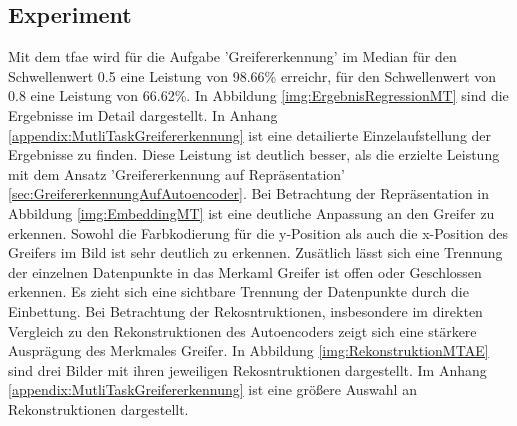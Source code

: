 	\subsection{Experiment}
	Mit dem \ac{tfae} wird für die Aufgabe 'Greifererkennung' im Median für den Schwellenwert 0.5 eine Leistung von 98.66\% erreichr, für den Schwellenwert von 0.8 eine Leistung von 66.62\%. In Abbildung \ref{img:ErgebnisRegressionMT} sind die Ergebnisse im Detail dargestellt. In Anhang \ref{appendix:MutliTaskGreifererkennung}	ist eine detailierte Einzelaufstellung der Ergebnisse zu finden. Diese Leistung ist deutlich besser, als die erzielte Leistung mit dem Ansatz 'Greifererkennung auf Repräsentation' \ref{sec:GreifererkennungAufAutoencoder}. Bei Betrachtung der Repräsentation in Abbildung \ref{img:EmbeddingMT} ist eine deutliche Anpassung an den Greifer zu erkennen. Sowohl die Farbkodierung für die y-Position als auch die x-Position des Greifers im Bild ist sehr deutlich zu erkennen. Zusätlich lässt sich eine Trennung der einzelnen Datenpunkte in das Merkaml Greifer ist offen oder Geschlossen erkennen. Es zieht sich eine sichtbare Trennung der Datenpunkte durch die Einbettung. Bei Betrachtung der Rekosntruktionen, insbesondere im direkten Vergleich zu den Rekonstruktionen des Autoencoders zeigt sich eine stärkere Ausprägung des Merkmales Greifer. In Abbildung \ref{img:RekonstruktionMTAE} sind drei Bilder mit ihren jeweiligen Rekosntruktionen dargestellt. Im Anhang \ref{appendix:MutliTaskGreifererkennung} ist eine größere Auswahl an Rekonstruktionen dargestellt.  
	
